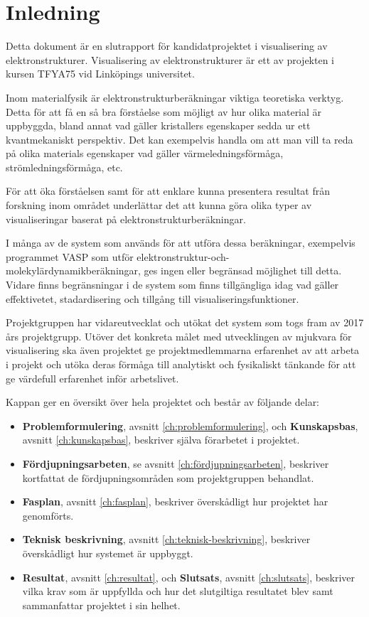 \documentclass[a4paper,12pt,twoside,openright]{report}
\begin{document}
\section{Inledning}
\label{ch:inledning}
Detta dokument är en slutrapport för kandidatprojektet i visualisering av elektronstrukturer. Visualisering av elektronstrukturer är ett av projekten i kursen TFYA75 vid
Linköpings universitet. 

Inom materialfysik är elektronstrukturberäkningar viktiga teoretiska verktyg. Detta för att få en så bra förståelse som möjligt av hur olika material är uppbyggda, bland annat vad gäller kristallers egenskaper sedda ur ett kvantmekaniskt perspektiv. Det kan exempelvis handla om att man vill ta reda på olika materials egenskaper vad gäller värmeledningsförmåga, strömledningsförmåga, etc.

För att öka förståelsen samt för att enklare kunna presentera resultat från forskning inom området underlättar det att kunna göra olika typer av visualiseringar baserat på elektronstrukturberäkningar.

I många av de system som används för att utföra dessa beräkningar, exempelvis programmet VASP som utför elektronstruktur-och-molekylärdynamikberäkningar, ges ingen eller begränsad möjlighet till detta. Vidare finns begränsningar i de system som finns tillgängliga idag vad gäller effektivetet, stadardisering och tillgång till visualiseringsfunktioner.

Projektgruppen har vidareutvecklat och utökat det system som togs fram av 2017 års projektgrupp. Utöver det konkreta målet med utvecklingen av mjukvara för visualisering ska även projektet ge projektmedlemmarna erfarenhet av att arbeta i projekt och utöka deras förmåga till analytiskt och fysikaliskt tänkande för att ge värdefull erfarenhet inför arbetslivet.

Kappan ger en översikt över hela projektet och består av följande delar:

\begin{itemize}
	\item \textbf{Problemformulering}, avsnitt \ref{ch:problemformulering}, och \textbf{Kunskapsbas}, avsnitt \ref{ch:kunskapsbas}, beskriver själva förarbetet i projektet.
	
	\item \textbf{Fördjupningsarbeten}, se avsnitt \ref{ch:fördjupningsarbeten}, beskriver kortfattat de fördjupningsområden som projektgruppen behandlat.
	
	\item \textbf{Fasplan}, avsnitt \ref{ch:fasplan}, beskriver överskådligt hur projektet har genomförts.

	\item \textbf{Teknisk beskrivning}, avsnitt \ref{ch:teknisk-beskrivning}, beskriver överskådligt hur systemet är uppbyggt.
	
	\item \textbf{Resultat}, avsnitt \ref{ch:resultat}, och \textbf{Slutsats}, avsnitt \ref{ch:slutsats}, beskriver vilka krav som är uppfyllda och hur det slutgiltiga resultatet blev samt sammanfattar projektet i sin helhet.
\end{itemize}
\end{document}
